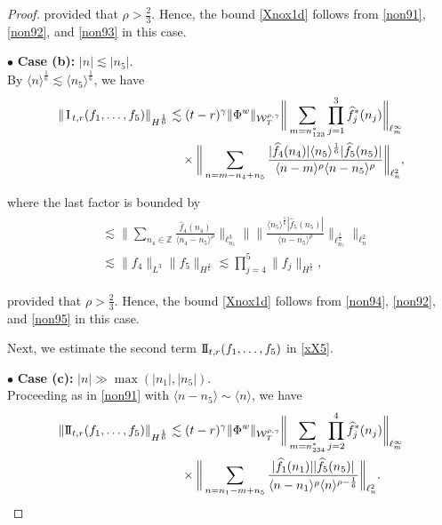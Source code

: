\documentclass[letterpaper, 11pt,  reqno]{amsart}
\newcommand{\1}{\hspace{0.5mm}\text{I}\hspace{0.5mm}}
\newcommand{\II}{\text{I \hspace{-2.8mm} I} }
\newcommand{\noi}{\noindent}
\newcommand{\Z}{\mathbb{Z}}
\newcommand{\bul}{\bullet}
\newcommand{\g}{\gamma}
\newcommand{\ft}{\widehat}
\renewcommand{\l}{\ell}
\newcommand{\les}{\lesssim}
\newcommand{\jb}[1]
{\langle #1 \rangle}
\newcommand{\W}{\mathcal{W}}
\numberwithin{equation}{section}
\numberwithin{theorem}{section}
\begin{document}
\begin{proof}
\noi
provided that $\rho > \frac 23$.
Hence, the bound \eqref{Xnox1d}
follows from \eqref{non91}, 
\eqref{non92}, and 
\eqref{non93} in this case.


\medskip


\noi
$\bul$ {\bf Case (b):} $|n|\les |n_5|$.\\ %
\indent
By $\jb{n}^\frac 16 \les\jb{n_5}^\frac 16$, we have 
\begin{align}
\begin{split}
 \|\1_{t, r}(f_1, \dots, f_5)\|_{H^\frac 16}
&  
\les 
(t - r)^\g
\|\Phi^w\|_{  \W^{\rho,\g}_T} 
\bigg\| \sum_{m = n_{123}^*}
\prod_{j = 1}^3
{\ft f_j}^*(n_j)\bigg\|_{\l^\infty_{m}}\\
& \quad \times \bigg\| 
\sum_{n = m - n_4 + n_5}
\frac {|\ft f_4(n_4)|  \jb{n_5}^\frac 16 |\ft f_5(n_5)|}{\jb{n - m}^{\rho}\jb{n - n_5}^{\rho}}
\bigg\|_{\l^2_n}, 
\end{split}
\label{non94}
\end{align}

\noi
where the last factor is bounded by 
\begin{align}
\begin{split}
& \les 
\bigg\|
\sum_{n_4 \in \Z}
\frac{\ft f_4(n_4)}{\jb{n_4 - n_5}^{\rho}}\bigg\|_{\l^3_{n_5}}
\Bigg\|
\bigg\|
\frac{  \jb{n_5}^\frac 16 |\ft f_5(n_5)|}{\jb{n - n_5}^{\rho}}\bigg\|_{\l^\frac 32_{n_5}}
\Bigg\|_{\l^2_n}\\
& \les  \|f_4\|_{L^3}
\|f_5\|_{H^\frac 16}
\les \prod_{j = 4}^5 \|f_j\|_{H^\frac 16}, 
\end{split}
\label{non95}
\end{align}

\noi
provided that $\rho > \frac 23$.
Hence, the bound \eqref{Xnox1d}
follows from \eqref{non94}, 
\eqref{non92}, and 
\eqref{non95} in this case.


\medskip

Next, we estimate
the second term
 $\II_{t, r}(f_1, \dots, f_5)$ in \eqref{xX5}.



\medskip


\noi
$\bul$ {\bf Case (c):} $|n|\gg \max(|n_1|, |n_5|)$.\\ %
\indent
Proceeding as in \eqref{non91} with $\jb{n- n_5} \sim \jb{n}$, we have
\begin{align}
\begin{split}
 \|\II_{t, r}(f_1, \dots, f_5)\|_{H^\frac 16}
&  
\les 
(t - r)^\g
\|\Phi^w\|_{  \W^{\rho,\g}_T} 
\bigg\| \sum_{m = n_{234}^*}
\prod_{j = 2}^4
{\ft f_j}^*(n_j)\bigg\|_{\l^\infty_{m}}\\
& \quad \times \bigg\| 
\sum_{n = n_1 -m + n_5}
\frac {|\ft f_1(n_1)|  |\ft f_5(n_5)|}{\jb{n - n_1}^{\rho}\jb{n}^{\rho - \frac 16}}
\bigg\|_{\l^2_n}.
\end{split}
\label{non96}
\end{align}


\end{proof}
\end{document}

